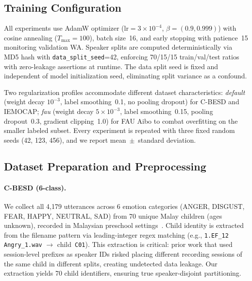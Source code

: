 \documentclass[11pt,a4paper]{article}
\begin{document}
\subsection{Training Configuration}
\label{ssec:training}

All experiments use AdamW optimizer ($\text{lr}=3\times 10^{-4}$,
$\beta=(0.9,0.999)$) with cosine annealing ($T_{\text{max}}=100$), batch
size~16, and early stopping with patience~15 monitoring validation WA.
Speaker splits are computed deterministically via MD5 hash with
\texttt{data\_split\_seed}=42, enforcing 70/15/15 train/val/test ratios with
zero-leakage assertions at runtime. The data split seed is fixed and
independent of model initialization seed, eliminating split variance as a
confound.

Two regularization profiles accommodate different dataset characteristics:
\textit{default} (weight decay $10^{-3}$, label smoothing~0.1, no pooling
dropout) for C-BESD and IEMOCAP; \textit{fau} (weight decay $5\times 10^{-3}$,
label smoothing~0.15, pooling dropout~0.3, gradient clipping~1.0) for FAU Aibo
to combat overfitting on the smaller labeled subset. Every experiment is
repeated with three fixed random seeds (42, 123, 456), and we report
mean~$\pm$~standard deviation.

\subsection{Dataset Preparation and Preprocessing}
\label{ssec:datasets}

\paragraph{C-BESD (6-class).} We collect all 4,179 utterances across 6 emotion
categories (ANGER, DISGUST, FEAR, HAPPY, NEUTRAL, SAD) from 70 unique Malay
children (ages unknown), recorded in Malaysian preschool
settings~\cite{sazali2023besd,rao2024cbesd}. Child identity
is extracted from the filename pattern via leading-integer regex matching (e.g.,
\texttt{1.EF\_12 Angry\_1.wav} $\rightarrow$ child~\texttt{C01}). This
extraction is critical: prior work that used session-level prefixes as speaker
IDs risked placing different recording sessions of the same child in different
splits, creating undetected data leakage. Our extraction yields 70 child
identifiers, ensuring true speaker-disjoint partitioning.
\end{document}

